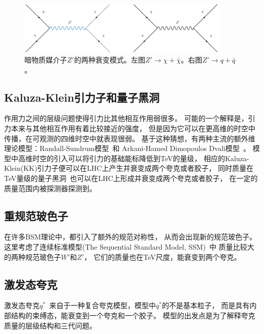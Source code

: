 \begin{figure}
  \begin{center}
    \includegraphics[width=0.9\textwidth]{figuresTHE/ZChl.pdf}
  \end{center}
  \caption{
暗物质媒介子$Z'$的两种衰变模式。左图$Z'\rightarrow \chi+\bar{\chi}$。右图$Z'\rightarrow q+\bar{q}$。
}
    \label{fig:ZChl}
\end{figure}

\subsection{Kaluza-Klein引力子和量子黑洞}
\label{sec:KKG}
作用力之间的层级问题使得引力比其他相互作用弱很多。
可能的一个解释是，引力本来与其他相互作用有着比较接近的强度，
但是因为它可以在更高维的时空中传播，在可观测的四维时空中就表现很弱。
基于这种猜想，有两种主流的额外维理论模型：Randall-Sundrum模型~\cite{RS1,RS2}和
Arkani-Hamed Dimopoulos Dvali模型~\cite{ADD}。
模型中高维时空的引入可以将引力的基础能标降低到TeV的量级，
相应的Kaluza-Klein(KK)引力子便可以在LHC上产生并衰变成两个夸克或者胶子，
同时质量在TeV量级的量子黑洞~\cite{qbh1,qbh2}也可以在LHC上形成并衰变成两个夸克或者胶子，
在一定的质量范围内被探测器探测到。



\subsection{重规范玻色子}
\label{sec:WZPrime}
在许多BSM理论中，都引入了额外的规范对称性，
从而会出现新的规范玻色子。
这里考虑了连续标准模型(The Sequential Standard Model, SSM)~\cite{zprime1,zprime3,wprime1}中
质量比较大的两种规范玻色子$W'$和$Z'$，
它们的质量也在TeV尺度，能衰变到两个夸克。

\subsection{激发态夸克}
\label{sec:QStar}
激发态夸克$q^*$~\cite{qstar1,qstar2}来自于一种复合夸克模型，模型中$q^*$的不是基本粒子，
而是具有内部结构的束缚态，能衰变到一个夸克和一个胶子。
模型的出发点是为了解释夸克质量的层级结构和三代问题。

